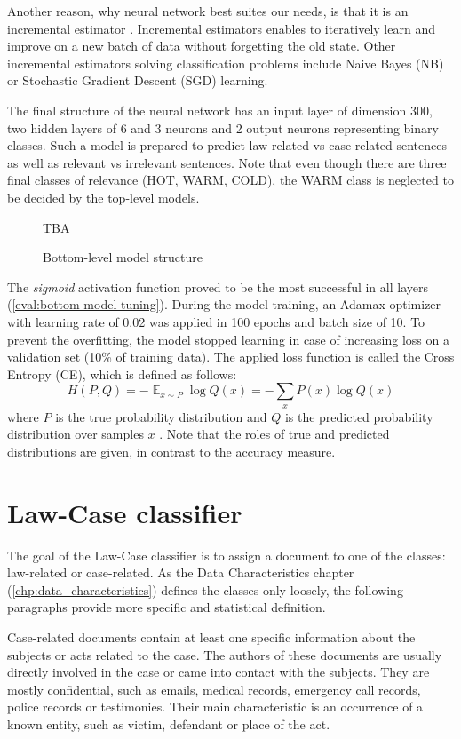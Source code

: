 \documentclass[
  digital, %
  table,   %
  lof,     %
  lot,     %
]{fithesis3}
\DeclareMathOperator{\EX}{\mathbb{E}}%
\begin{document}
Another reason, why neural network best suites our needs, is that it is an incremental estimator \cite{incrementalScikit}.
Incremental estimators enables to iteratively learn and improve on a new batch of data without forgetting the old state.
Other incremental estimators solving classification problems include Naive Bayes (NB) or Stochastic Gradient Descent (SGD) learning.

The final structure of the neural network has an input layer of dimension 300, two hidden layers of 6 and 3 neurons and 2 output neurons representing binary classes.
Such a model is prepared to predict law-related vs case-related sentences as well as relevant vs irrelevant sentences. Note that even though there are three final classes of relevance (HOT, WARM, COLD), the WARM class is neglected to be decided by the top-level models.

\begin{figure}[H]
\caption{Bottom-level model structure}
\label{fig:neural-network}
TBA
\end{figure}

The \textit{sigmoid} activation function proved to be the most successful in all layers (\ref{eval:bottom-model-tuning}).
During the model training, an Adamax optimizer with learning rate of 0.02 was applied in 100 epochs and batch size of 10.
To prevent the overfitting, the model stopped learning in case of increasing loss on a validation set (10\% of training data).
The applied loss function is called the Cross Entropy (CE), which is defined as follows:
$$
H(P, Q) = -\EX_{x \sim P} \log{Q(x)} = -\sum_x P(x) \log{Q(x)}
$$
where $P$ is the true probability distribution and $Q$ is the predicted probability distribution over samples $x$ \cite{Goodfellow-et-al-2016}.
Note that the roles of true and predicted distributions are given, in contrast to the accuracy measure.

\section{Law-Case classifier}
\label{sec:law-case-classifier}
The goal of the Law-Case classifier is to assign a document to one of the classes: law-related or case-related.
As the Data Characteristics chapter (\ref{chp:data_characteristics}) defines the classes only loosely, the following paragraphs provide more specific and statistical definition.

Case-related documents contain at least one specific information about the subjects or acts related to the case. 
The authors of these documents are usually directly involved in the case or came into contact with the subjects.
They are mostly confidential, such as emails, medical records, emergency call records, police records or testimonies.
Their main characteristic is an occurrence of a known entity, such as victim, defendant or place of the act.
\end{document}
